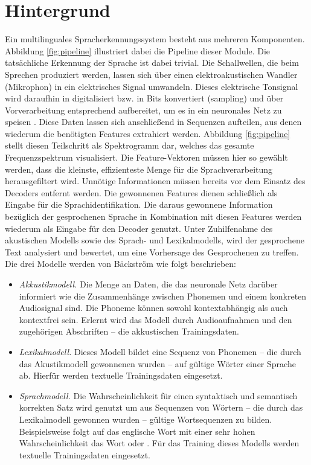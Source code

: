 \section{Hintergrund}
Ein multilinguales Spracherkennungssystem besteht aus mehreren Komponenten. Abbildung \ref{fig:pipeline} illustriert dabei die Pipeline dieser Module. Die tatsächliche Erkennung der Sprache ist dabei trivial. Die Schallwellen, die beim Sprechen produziert werden, lassen sich über einen elektroakustischen Wandler (Mikrophon) in ein elektrisches Signal umwandeln. Dieses elektrische Tonsignal wird daraufhin in digitalisiert bzw. in Bits konvertiert (sampling) und über Vorverarbeitung entsprechend aufbereitet, um es in ein neuronales Netz zu speisen {\cite{beat_tobias}}. Diese Daten lassen sich anschließend in Sequenzen aufteilen, aus denen wiederum die benötigten Features extrahiert werden. Abbildung \ref{fig:pipeline} stellt diesen Teilschritt als Spektrogramm dar, welches das gesamte Frequenzspektrum visualisiert. Die Feature-Vektoren müssen hier so gewählt werden, dass die kleinste, effizienteste Menge für die Sprachverarbeitung herausgefiltert wird. Unnötige Informationen müssen bereits vor dem Einsatz des Decoders entfernt werden. Die gewonnenen Features dienen schließlich als Eingabe für die Sprachidentifikation. Die daraus gewonnene Information bezüglich der gesprochenen Sprache in Kombination mit diesen Features werden wiederum als Eingabe für den Decoder genutzt. Unter Zuhilfenahme des akustischen Modells sowie des Sprach- und Lexikalmodells, wird der gesprochene Text analysiert und bewertet, um eine Vorhersage des Gesprochenen zu treffen.
Die drei Modelle werden von Bäckström \cite{Tom.2016} wie folgt beschrieben:

\begin{itemize}
    \item \textit{Akkustikmodell.} Die Menge an Daten, die das neuronale Netz darüber informiert wie die Zusammenhänge zwischen Phonemen und einem konkreten Audiosignal sind. Die Phoneme können
    sowohl kontextabhängig als auch kontextfrei sein.
    Erlernt wird das Modell durch Audioaufnahmen und den zugehörigen Abschriften – die akkustischen Trainingsdaten.
    \item \textit{Lexikalmodell.} Dieses Modell bildet eine Sequenz von Phonemen – die durch das Akustikmodell gewonnenen wurden – auf gültige Wörter einer Sprache ab. Hierfür werden textuelle Trainingsdaten eingesetzt.
    \item \textit{Sprachmodell.} Die Wahrscheinlichkeit für einen syntaktisch und semantisch korrekten Satz wird genutzt um aus Sequenzen von Wörtern – die durch das Lexikalmodell gewonnen wurden – gültige Wortsequenzen zu bilden.
    Beispielsweise folgt auf das englische Wort \grqq{} mit einer sehr hohen Wahrscheinlichkeit das Wort \grqq{} oder
    \grqq{}. Für das Training dieses Modells werden textuelle Trainingsdaten eingesetzt.
\end{itemize}

